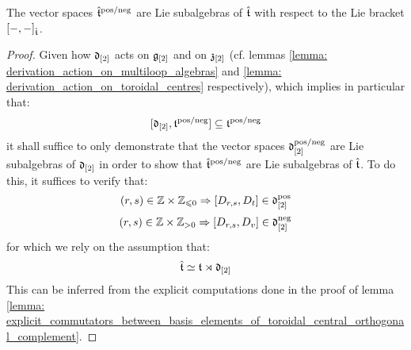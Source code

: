        \begin{lemma} \label{lemma: positive/negative_yangian_extended_toroidal_lie_algebras}
            The vector spaces $\hat{\mathfrak{t}}^{\mathrm{pos}/\mathrm{neg}}$ are Lie subalgebras of $\hat{\mathfrak{t}}$ with respect to the Lie bracket $[-, -]_{\hat{\mathfrak{t}}}$.
        \end{lemma}
            \begin{proof}
                Given how $\mathfrak{d}_{[2]}$ acts on $\mathfrak{g}_{[2]}$ and on $\mathfrak{z}_{[2]}$ (cf. lemmas \ref{lemma: derivation_action_on_multiloop_algebras} and \ref{lemma: derivation_action_on_toroidal_centres} respectively), which implies in particular that:
                    $$[\mathfrak{d}_{[2]}, \mathfrak{t}^{\mathrm{pos}/\mathrm{neg}}] \subseteq \mathfrak{t}^{\mathrm{pos}/\mathrm{neg}}$$
                it shall suffice to only demonstrate that the vector spaces $\mathfrak{d}_{[2]}^{\mathrm{pos}/\mathrm{neg}}$ are Lie subalgebras of $\mathfrak{d}_{[2]}$ in order to show that $\hat{\mathfrak{t}}^{\mathrm{pos}/\mathrm{neg}}$ are Lie subalgebras of $\hat{\mathfrak{t}}$. To do this, it suffices to verify that:
                    $$(r, s) \in \Z \x \Z_{\leq 0} \implies [D_{r, s}, D_t] \in \d_{[2]}^{\positive}$$
                    $$(r, s) \in \Z \x \Z_{> 0} \implies [D_{r, s}, D_v] \in \d_{[2]}^{\negative}$$
                for which we rely on the assumption that:
                    $$\hat{\mathfrak{t}} \simeq \mathfrak{t} \rtimes \mathfrak{d}_{[2]}$$
                This can be inferred from the explicit computations done in the proof of lemma \ref{lemma: explicit_commutators_between_basis_elements_of_toroidal_central_orthogonal_complement}.
            \end{proof}

